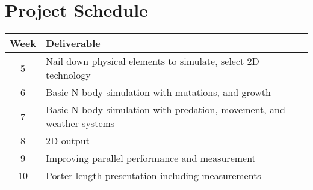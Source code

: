 \chapter*{Project Schedule}

\begin{tabular}{c | l}
Week & Deliverable\\
\hline
5 & Nail down physical elements to simulate, select 2D technology\\
6 & Basic N-body simulation with mutations, and growth\\
7 & Basic N-body simulation with predation, movement, and weather systems\\
8 & 2D output\\
9 & Improving parallel performance and measurement\\
10 & Poster length presentation including measurements\\
\end{tabular}